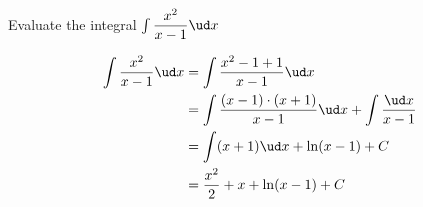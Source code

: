 

\question[2] Evaluate the integral $\int\dfrac{x^2}{x-1}\ud x$


\ifprintanswers
\fi 

\begin{solution}[\halfpage]
	\begin{align}
		\int\dfrac{x^2}{x-1}\ud x &= \int\dfrac{x^2-1+1}{x-1}\ud x \\
		&= \int\dfrac{(x-1)\cdot(x+1)}{x-1}\ud x + \int\dfrac{\ud x}{x-1} \\
		&= \int(x+1)\ud x + \ln(x-1) + C \\
		&= \dfrac{x^2}{2} + x + \ln(x-1) + C
	\end{align}
\end{solution}
